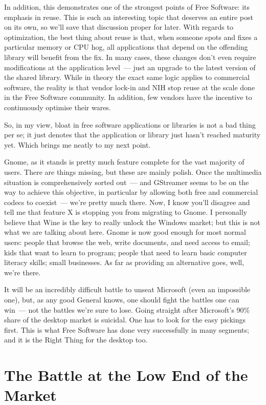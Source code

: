 \documentclass{book}
\begin{document}
In addition, this demonstrates one of the strongest points of Free
Software: its emphasis in reuse. This is such an interesting topic
that deserves an entire post on its own, so we'll save that discussion
proper for later. With regards to optimization, the best thing about
reuse is that, when someone spots and fixes a particular memory or CPU
hog, all applications that depend on the offending library will
benefit from the fix. In many cases, these changes don't even require
modifications at the application level~--- just an upgrade to the
latest version of the shared library. While in theory the exact same
logic applies to commercial software, the reality is that vendor
lock-in and NIH stop reuse at the scale done in the Free Software
community. In addition, few vendors have the incentive to continuously
optimise their wares.

So, in my view, bloat in free software applications or libraries is
not a bad thing per se; it just denotes that the application or
library just hasn't reached maturity yet. Which brings me neatly to my
next point.

Gnome, as it stands is pretty much feature complete for the vast
majority of users. There are things missing, but these are mainly
polish. Once the multimedia situation is comprehensively sorted out~---
and GStreamer seems to be on the way to achieve this objective, in
particular by allowing both free and commercial codecs to coexist~---
we're pretty much there. Now, I know you'll disagree and tell me that
feature X is stopping you from migrating to Gnome. I personally
believe that Wine is the key to really unlock the Windows market; but
this is not what we are talking about here. Gnome is now good enough
for most normal users: people that browse the web, write documents,
and need access to email; kids that want to learn to program; people
that need to learn basic computer literacy skills; small
businesses. As far as providing an alternative goes, well, we're
there.

It will be an incredibly difficult battle to unseat Microsoft (even an
impossible one), but, as any good General knows, one should fight the
battles one can win~--- not the battles we're sure to lose. Going
straight after Microsoft's 90\% share of the desktop market is
suicidal. One has to look for the easy pickings first. This is what
Free Software has done very successfully in many segments; and it is
the Right Thing for the desktop too.

\section{The Battle at the Low End of the Market}
\end{document}
